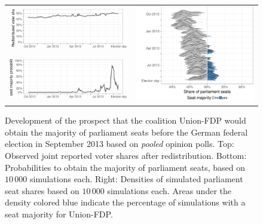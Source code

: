 \documentclass[smallcondensed]{svjour3}     %
\begin{document}
\begin{figure}[H]\centering
\begin{tabular}{ll}
\includegraphics[height=.15\textwidth]{figures/2013_pooled_cdufdp_rawSharesRedist.pdf}
&
\multirow{2}{*}[13ex]{\includegraphics[height=.3\textwidth]{figures/2013_pooled_cdufdp_ridgeline.pdf}}
\\
\includegraphics[height=.15\textwidth]{figures/2013_pooled_cdufdp_prob.pdf}
\end{tabular}
\caption{Development of the prospect that the coalition Union-FDP would obtain
the majority of parliament seats before the German federal election in September
2013 based on \emph{pooled} opinion polls. Top: Observed joint reported voter shares after
redistribution. Bottom: Probabilities to obtain the majority of parliament seats,
based on $10\,000$ simulations each.
Right: Densities of simulated parliament seat shares based on $10\,000$ simulations each.
Areas under the density colored blue indicate the percentage of
simulations with a seat majority for Union-FDP.
\label{fig:2013_cdufdp}
}
\end{figure}
\end{document}
